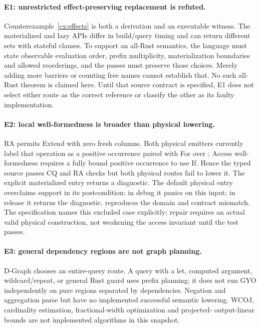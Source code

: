 \paragraph{E1: unrestricted effect-preserving replacement is refuted.}
Counterexample~\ref{cx:effects} is both a derivation and an executable witness.
The materialized and lazy APIs differ in build/query timing and can return
different sets with stateful clauses. To support an all-Rust semantics,
the language must state observable evaluation order, prefix multiplicity,
materialization boundaries and allowed reorderings, and the passes must
preserve those choices. Merely adding more barriers or counting free names
cannot establish that. No such all-Rust theorem is claimed here.
Until that source contract is specified, E1 does not select either route as
the correct reference or classify the other as its faulty implementation.

\paragraph{E2: local well-formedness is broader than physical lowering.}
RA permits Extend with zero fresh columns. Both physical emitters currently
label that operation as a positive  occurrence paired with
For over ; Access well-formedness requires a fully bound
positive occurrence to use If. Hence the typed source
 passes CQ and RA checks but both
physical routes fail to lower it. The explicit materialized entry returns a
diagnostic. The default physical entry overclaims support in its postcondition:
in debug it panics on this input; in release it returns the diagnostic.
 reproduces the domain and contract mismatch. The specification names this excluded case explicitly;
repair requires an actual valid physical construction, not weakening the
access invariant until the test passes.

\paragraph{E3: general dependency regions are not graph planning.}
D-Graph chooses an entire-query route. A query with a let, computed argument,
wildcard/repeat, or general Rust guard uses prefix planning; it does not run
GYO independently on pure regions separated by dependencies. Negation and
aggregation parse but have no implemented successful semantic lowering.
WCOJ, cardinality estimation, fractional-width optimization and projected-
output-linear bounds are not implemented algorithms in this snapshot.

